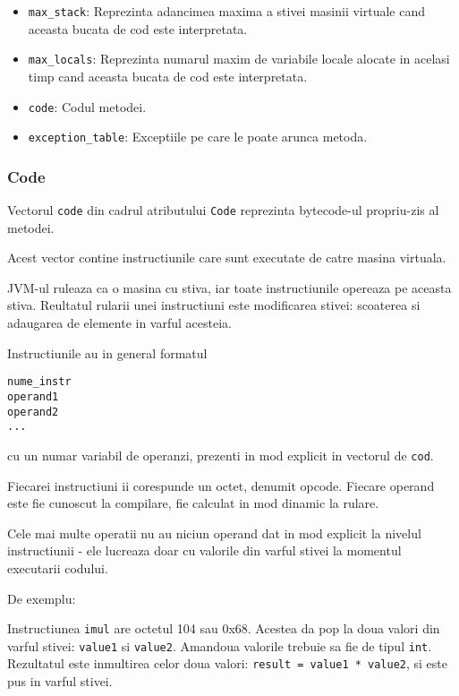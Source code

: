 \begin{itemize}
	\tightlist
	\item
	      \texttt{max\_stack}: Reprezinta adancimea maxima a stivei masinii
	      virtuale cand aceasta bucata de cod este interpretata.
	\item
	      \texttt{max\_locals}: Reprezinta numarul maxim de variabile locale
	      alocate in acelasi timp cand aceasta bucata de cod este interpretata.
	\item
	      \texttt{code}: Codul metodei.
	\item
	      \texttt{exception\_table}: Exceptiile pe care le poate arunca metoda.
\end{itemize}

\subsubsection{Code}

Vectorul \texttt{code} din cadrul atributului \texttt{Code} reprezinta
bytecode-ul propriu-zis al metodei.

Acest vector contine instructiunile care sunt executate de catre masina
virtuala.

JVM-ul ruleaza ca o masina cu stiva, iar toate instructiunile opereaza
pe aceasta stiva. Reultatul rularii unei instructiuni este modificarea
stivei: scoaterea si adaugarea de elemente in varful acesteia.

Instructiunile au in general formatul \cite{instruction_format}

\begin{verbatim}
nume_instr
operand1
operand2
...
\end{verbatim}

cu un numar variabil de operanzi, prezenti in mod explicit in vectorul
de \texttt{cod}.

Fiecarei instructiuni ii corespunde un octet, denumit opcode. Fiecare
operand este fie cunoscut la compilare, fie calculat in mod dinamic la
rulare.

Cele mai multe operatii nu au niciun operand dat in mod explicit la
nivelul instructiunii - ele lucreaza doar cu valorile din varful stivei
la momentul executarii codului.

De exemplu:

Instructiunea \texttt{imul} are octetul 104 sau 0x68.
Acestea da pop la doua valori din varful stivei: \texttt{value1} si
\texttt{value2}. Amandoua valorile trebuie sa fie de tipul \texttt{int}.
Rezultatul este inmultirea celor doua valori:
\texttt{result\ =\ value1\ *\ value2}, si este pus in varful stivei.

